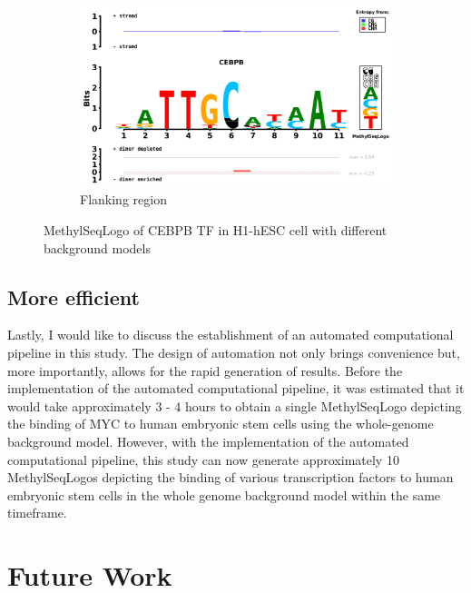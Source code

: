 \documentclass{PHlab-thesis}
\begin{document}
\begin{figure}[H]
	\ContinuedFloat
	\begin{subfigure}[T]{0.9\textwidth}
		\includegraphics[width=\textwidth]{figures/yulingCEBPB_human_H1-hESC_50_Methyl_Kullback-Liebler_seqlogo.png}
		\caption{Flanking region}
		\label{fig:CEBPBFlanking region} 
	\end{subfigure}
	\caption{MethylSeqLogo of CEBPB TF in H1-hESC cell with different background models}
	\label{fig:CEBPBregion} 
\end{figure}
\subsection{More efficient}
Lastly, I would like to discuss the establishment of an automated computational pipeline in this study. The design of automation not only brings convenience but, more importantly, allows for the rapid generation of results. Before the implementation of the automated computational pipeline, it was estimated that it would take approximately 3 - 4 hours to obtain a single MethylSeqLogo depicting the binding of MYC to human embryonic stem cells using the whole-genome background model. However, with the implementation of the automated computational pipeline, this study can now generate approximately 10 MethylSeqLogos depicting the binding of various transcription factors to human embryonic stem cells in the whole genome background model within the same timeframe.

\section{Future Work}
\end{document}
